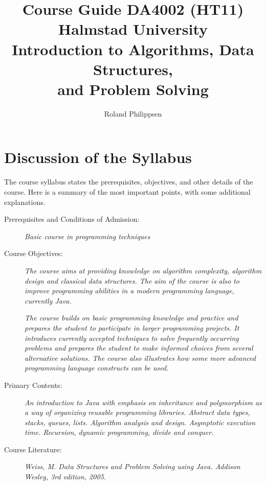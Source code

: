 \documentclass[a4paper,twoculumn,10pt]{article}
\begin{document}
\title{{\normalsize Course Guide DA4002 (HT11) Halmstad University}\\
  Introduction to Algorithms, Data Structures,\\ and Problem Solving}
\author{Roland Philippsen}
\maketitle



\section{Discussion of the Syllabus}

The course syllabus states the prerequisites, objectives, and other details of the course.
Here is a summary of the most important points, with some additional explanations.

\begin{description}

\item[Prerequisites and Conditions of Admission:]
  \emph{Basic course in programming techniques}

\item[Course Objectives:]
  \emph{
    The course aims at providing knowledge on algorithm complexity, algorithm design and classical data structures.
    The aim of the course is also to improve programming abilities in a modern programming language, currently Java.
  }
  
  \emph{
    The course builds on basic programming knowledge and practice and prepares the student to participate in larger programming projects.
    It introduces currently accepted techniques to solve frequently occurring problems and prepares the student to make informed choices from several alternative solutions.
    The course also illustrates how some more advanced programming language constructs can be used.
  }
  
\item[Primary Contents:]
  \emph{
    An introduction to Java with emphasis on inheritance and polymorphism as a way of organizing reusable programming libraries.
    Abstract data types, stacks, queues, lists.
    Algorithm analysis and design.
    Asymptotic execution time.
    Recursion, dynamic programming, divide and conquer.
  }
  
\item[Course Literature:]
  \emph{
    Weiss, M. \emph{Data Structures and Problem Solving using Java}. Addison Wesley, 3rd edition, 2005.
  }
  
\end{description}
\end{document}
